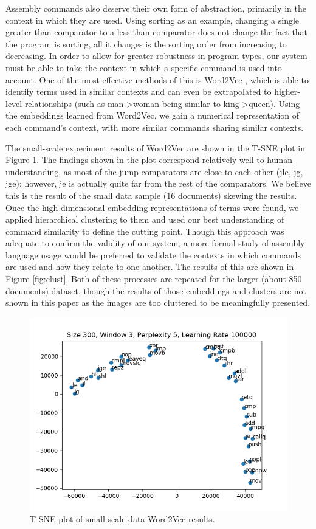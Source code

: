 Assembly commands also deserve their own form of abstraction, primarily in the context in which they are used. Using sorting as an example, changing a single greater-than comparator to a less-than comparator does not change the fact that the program is sorting, all it changes is the sorting order from increasing to decreasing. In order to allow for greater robustness in program types, our system must be able to take the context in which a specific command is used into account. One of the most effective methods of this is Word2Vec \cite{mikolov2013distributed}, which is able to identify terms used in similar contexts and can even be extrapolated to higher-level relationships (such as man->woman being similar to king->queen). Using the embeddings learned from Word2Vec, we gain a numerical representation of each command's context, with more similar commands sharing similar contexts. 

The small-scale experiment results of Word2Vec are shown in the T-SNE plot in Figure \ref{fig:tsne}. The findings shown in the plot correspond relatively well to human understanding, as most of the jump comparators are close to each other (jle, jg, jge); however, je is actually quite far from the rest of the comparators. We believe this is the result of the small data sample (16 documents) skewing the results. Once the high-dimensional embedding representations of terms were found, we applied hierarchical clustering to them and used our best understanding of command similarity to define the cutting point. Though this approach was adequate to confirm the validity of our system, a more formal study of assembly language usage would be preferred to validate the contexts in which commands are used and how they relate to one another. The results of this are shown in Figure \ref{fig:clust}. Both of these processes are repeated for the larger (about 850 documents) dataset, though the results of those embeddings and clusters are not shown in this paper as the images are too cluttered to be meaningfully presented.

\begin{figure}
  \includegraphics[width=\linewidth]{./figures/tsne_small.png}
  \caption{T-SNE plot of small-scale data Word2Vec results.}
  \label{fig:tsne}
\end{figure}

